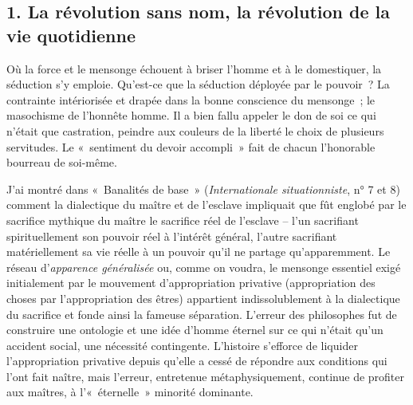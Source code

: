 \documentclass[french,twoside]{book} %
\newcommand{\astermono}{\medskip\centerline{\color{rubric}\large\selectfont{\syms ✻}}\medskip\par}%
\begin{document}
\subsection[{1. La révolution sans nom, la révolution de la vie quotidienne}]{\textsc{1.} La révolution sans nom, la révolution de la vie quotidienne}
\noindent Où la force et le mensonge échouent à briser l’homme et à le domestiquer, la séduction s’y emploie. Qu’est-ce que la séduction déployée par le pouvoir ? La contrainte intériorisée et drapée dans la bonne conscience du mensonge ; le masochisme de l’honnête homme. Il a bien fallu appeler le don de soi ce qui n’était que castration, peindre aux couleurs de la liberté le choix de plusieurs servitudes. Le « sentiment du devoir accompli » fait de chacun l’honorable bourreau de soi-même.\par
J’ai montré dans « Banalités de base » (\emph{Internationale situationniste}, n° 7 et 8) comment la dialectique du maître et de l’esclave impliquait que fût englobé par le sacrifice mythique du maître le sacrifice réel de l’esclave – l’un sacrifiant spirituellement son pouvoir réel à l’intérêt général, l’autre sacrifiant matériellement sa vie réelle à un pouvoir qu’il ne partage qu’apparemment. Le réseau d’\emph{apparence généralisée} ou, comme on voudra, le mensonge essentiel exigé initialement par le mouvement d’appropriation privative (appropriation des choses par l’appropriation des êtres) appartient indissolublement à la dialectique du sacrifice et fonde ainsi la fameuse séparation. L’erreur des philosophes fut de construire une ontologie et une idée d’homme éternel sur ce qui n’était qu’un accident social, une nécessité contingente. L’histoire s’efforce de liquider l’appropriation privative depuis qu’elle a cessé de répondre aux conditions qui l’ont fait naître, mais l’erreur, entretenue métaphysiquement, continue de profiter aux maîtres, à l’« éternelle » minorité dominante.\par

\astermono
\end{document}
